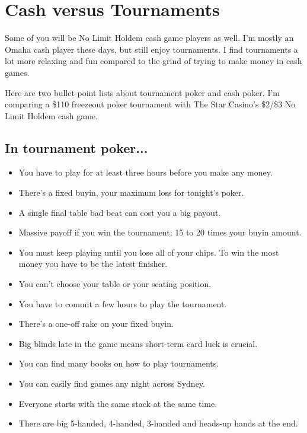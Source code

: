 \chapter{Cash versus Tournaments}


Some of you will be No Limit Holdem cash game players as well. I'm
mostly an Omaha cash player these days, but still enjoy tournaments. I
find tournaments a lot more relaxing and fun compared to the grind of
trying to make money in cash games.

Here are two bullet-point lists about tournament poker and cash
poker. I'm comparing a \$110 freezeout poker tournament with The Star
Casino's \$2/\$3 No Limit Holdem cash game.



\section{In tournament poker...}

\begin{itemize}
  \item You have to play for at least three hours before you make any money.
  \item There's a fixed buyin, your maximum loss for tonight's poker.
  \item A single final table bad beat can cost you a big payout.
  \item Massive payoff if you win the tournament; 15 to 20 times your
    buyin amount.
  \item You must keep playing until you lose all of your chips. To win
    the most money you have to be the latest finisher.
  \item You can't choose your table or your seating position.
  \item You have to commit a few hours to play the tournament.
  \item There's a one-off rake on your fixed buyin.
  \item Big blinds late in the game means short-term card luck is crucial.
  \item You can find many books on how to play tournaments.
  \item You can easily find games any night across Sydney.
  \item Everyone starts with the same stack at the same time.
  \item There are big 5-handed, 4-handed, 3-handed and heads-up hands
    at the end.
\end{itemize}

